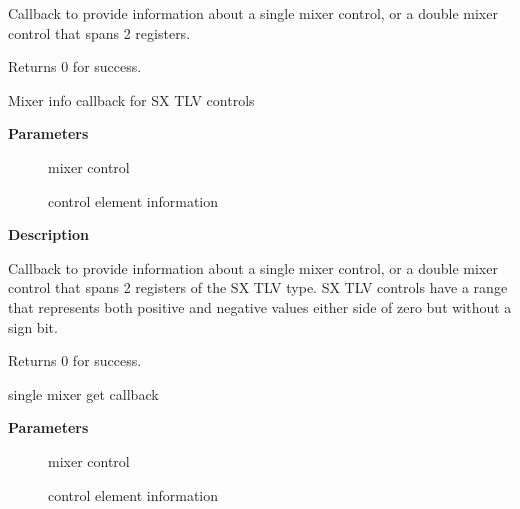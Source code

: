 \documentclass[a4paper,8pt,english]{sphinxmanual}
\begin{document}
Callback to provide information about a single mixer control, or a double
mixer control that spans 2 registers.

Returns 0 for success.

\begin{fulllineitems}
\label{sound/kernel-api/alsa-driver-api:c.snd_soc_info_volsw_sx}
Mixer info callback for SX TLV controls

\end{fulllineitems}


\textbf{Parameters}
\begin{description}
\item[{}] \leavevmode
mixer control

\item[{}] \leavevmode
control element information

\end{description}

\textbf{Description}

Callback to provide information about a single mixer control, or a double
mixer control that spans 2 registers of the SX TLV type. SX TLV controls
have a range that represents both positive and negative values either side
of zero but without a sign bit.

Returns 0 for success.

\begin{fulllineitems}
\label{sound/kernel-api/alsa-driver-api:c.snd_soc_get_volsw}
single mixer get callback

\end{fulllineitems}


\textbf{Parameters}
\begin{description}
\item[{}] \leavevmode
mixer control

\item[{}] \leavevmode
control element information

\end{description}
\end{document}
